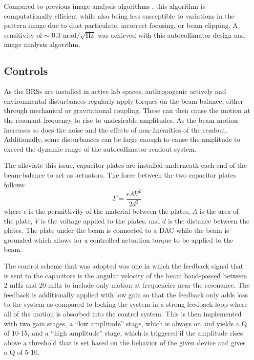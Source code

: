 \documentclass [12pt, proquest]{uwthesis}[2019]
\begin{document}
Compared to previous image analysis algorithms \cite{MSA}, this algorithm is computationally efficient while also being less susceptible to variations in the pattern image due to dust particulate, incorrect focusing, or beam clipping. A sensitivity of $\sim$ 0.3 nrad$/\sqrt{\text{Hz}}$ was achieved with this autocollimator design and image analysis algorithm.

\subsection{Controls}

\quad As the BRSs are installed in active lab spaces, anthropogenic actively and environmental disturbances regularly apply torques on the beam-balance, either through mechanical or gravitational coupling. These can then cause the motion at the resonant frequency to rise to undesirable amplitudes. As the beam motion increases so does the noise and the effects of non-linearities of the readout. Additionally, some disturbances can be large enough to cause the amplitude to exceed the dynamic range of the autocollimator readout system.

The alleviate this issue, capacitor plates are installed underneath each end of the beam-balance to act as actuators. The force between the two capacitor plates follows: 
\begin{equation}
F=\frac{\epsilon A V^2}{2d^2} \label{cap}
\end{equation}
where $\epsilon$ is the permittivity of the material between the plates, $A$ is the area of the plate, $V$ is the voltage applied to the plates, and $d$ is the distance between the plates. The plate under the beam is connected to a DAC while the beam is grounded which allows for a controlled actuation torque to be applied to the beam. 

The control scheme that was adopted was one in which the feedback signal that is sent to the capacitors is the angular velocity of the beam band-passed between 2 mHz and 20 mHz to include only motion at frequencies near the resonance. The feedback is additionally applied with low gain so that the feedback only adds loss to the system as compared to locking the system in a strong feedback loop where all of the motion is absorbed into the control system. This is then implemented with two gain stages, a ``low amplitude'' stage, which is always on and yields a Q of 10-15, and a ``high amplitude'' stage, which is triggered if the amplitude rises above a threshold that is set based on the behavior of the given device and gives a Q of 5-10.
\end{document}

